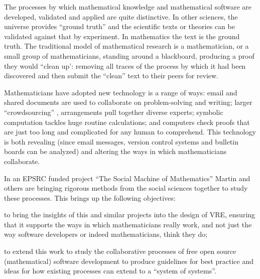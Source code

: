 \begin{workpackage}[id=social-aspects,wphases=0-48,
  title=Social Aspects,
  lead=UO,
  UORM=23,USHRM=18,USORM=6] 


\begin{wpobjectives}

The processes by which mathematical knowledge and mathematical
software are developed, validated and applied are quite
distinctive. In other sciences, the universe provides ``ground truth''
and the scientific texts or theories can be validated against that by
experiment. In mathematics the text is the ground truth. The
traditional model of mathematical research is a mathematician, or a
small group of mathematicians, standing around a blackboard, producing
a proof they would ``clean up': removing all traces of the process
by which it had been discovered and then submit the ``clean'' text to
their peers for review.

Mathematicians have adopted new technology is a range of ways: email
and shared documents are used to collaborate on problem-solving and
writing; larger ``crowdsourcing'' \cite{polymath_SIAM, PolymathBlog},
arrangements pull together diverse experts; symbolic computation
tackles huge routine calculations; and computers check proofs that are
just too long and complicated for any human to comprehend. This
technology is both revealing (since email messages, version control
systems and bulletin boards can be analyzed) and altering the ways in
which mathematicians collaborate.

In an EPSRC funded project ``The Social Machine of Mathematics''
Martin and others are bringing rigorous methods from the social 
sciences together to study these processes. This brings up the following
objectives: 
\begin{compactitem}
\item to bring the insights of this and similar projects into the
  design of \TheProject VRE, ensuring that it supports the ways in
  which mathematicians really work, and not just the way software
  developers or indeed mathematicians, think they do;
\item to extend this work to study the collaborative processes of free
  open source (mathematical) software development to produce
  guidelines for best practice and ideas for how existing processes
  can extend to a ``system of systems''.
\end{compactitem} 
\end{wpobjectives}


\end{workpackage}
